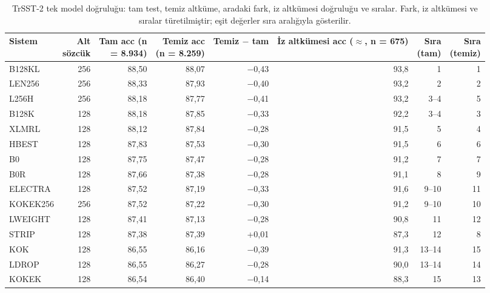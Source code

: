 \documentclass[11pt]{article}
\begin{document}
\begin{table}[!htbp]
\centering
\footnotesize
\setlength{\tabcolsep}{3pt}
\begin{tabular}{lrrrrrrr}
\toprule
Sistem & \makecell[r]{Alt \\ sözcük} & \makecell[r]{Tam acc (n \\ = 8.934)} & \makecell[r]{Temiz acc \\ (n = 8.259)} & \makecell[r]{Temiz \\ $-$ tam} & \makecell[r]{İz altkümesi \\ acc ($\approx$, n = 675)} & \makecell[r]{Sıra \\ (tam)} & \makecell[r]{Sıra \\ (temiz)} \\
\midrule
B128KL & \mbox{256} & \mbox{88,50} & \mbox{88,07} & \mbox{$-$0,43} & \mbox{93,8} & \mbox{1} & \mbox{1} \\
LEN256 & \mbox{256} & \mbox{88,33} & \mbox{87,93} & \mbox{$-$0,40} & \mbox{93,2} & \mbox{2} & \mbox{2} \\
L256H & \mbox{256} & \mbox{88,18} & \mbox{87,77} & \mbox{$-$0,41} & \mbox{93,2} & \mbox{3–4} & \mbox{5} \\
B128K & \mbox{128} & \mbox{88,18} & \mbox{87,85} & \mbox{$-$0,33} & \mbox{92,2} & \mbox{3–4} & \mbox{3} \\
XLMRL & \mbox{128} & \mbox{88,12} & \mbox{87,84} & \mbox{$-$0,28} & \mbox{91,5} & \mbox{5} & \mbox{4} \\
HBEST & \mbox{128} & \mbox{87,83} & \mbox{87,53} & \mbox{$-$0,30} & \mbox{91,5} & \mbox{6} & \mbox{6} \\
B0 & \mbox{128} & \mbox{87,75} & \mbox{87,47} & \mbox{$-$0,28} & \mbox{91,2} & \mbox{7} & \mbox{7} \\
B0R & \mbox{128} & \mbox{87,66} & \mbox{87,38} & \mbox{$-$0,28} & \mbox{91,1} & \mbox{8} & \mbox{9} \\
ELECTRA & \mbox{128} & \mbox{87,52} & \mbox{87,19} & \mbox{$-$0,33} & \mbox{91,6} & \mbox{9–10} & \mbox{11} \\
KOKEK256 & \mbox{256} & \mbox{87,52} & \mbox{87,22} & \mbox{$-$0,30} & \mbox{91,2} & \mbox{9–10} & \mbox{10} \\
LWEIGHT & \mbox{128} & \mbox{87,41} & \mbox{87,13} & \mbox{$-$0,28} & \mbox{90,8} & \mbox{11} & \mbox{12} \\
STRIP & \mbox{128} & \mbox{87,38} & \mbox{87,39} & \mbox{+0,01} & \mbox{87,3} & \mbox{12} & \mbox{8} \\
KOK & \mbox{128} & \mbox{86,55} & \mbox{86,16} & \mbox{$-$0,39} & \mbox{91,3} & \mbox{13–14} & \mbox{15} \\
LDROP & \mbox{128} & \mbox{86,55} & \mbox{86,27} & \mbox{$-$0,28} & \mbox{90,0} & \mbox{13–14} & \mbox{14} \\
KOKEK & \mbox{128} & \mbox{86,54} & \mbox{86,40} & \mbox{$-$0,14} & \mbox{88,3} & \mbox{15} & \mbox{13} \\
\bottomrule
\end{tabular}
\caption{TrSST-2 tek model doğruluğu: tam test, temiz altküme, aradaki fark, iz altkümesi doğruluğu ve sıralar. Fark, iz altkümesi ve sıralar türetilmiştir; eşit değerler sıra aralığıyla gösterilir.}
\label{tab:18}
\end{table}
\end{document}
